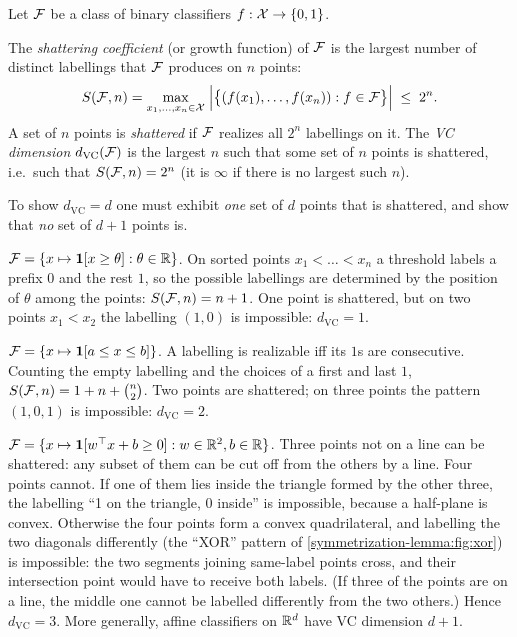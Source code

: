 \begin{notechapter}
Let $\mathcal{F}$ be a class of binary classifiers $f:\mathcal{X}\to\{0,1\}$.

\begin{definition}
The \emph{shattering coefficient} (or growth function) of $\mathcal{F}$ is the largest
number of distinct labellings that $\mathcal{F}$ produces on $n$ points:
\[
  S(\mathcal{F}, n) = \max_{x_1,\dots,x_n\in\mathcal{X}}\;\Bigl|\bigl\{(f(x_1),\dots,f(x_n)) : f\in\mathcal{F}\bigr\}\Bigr| \;\leq\; 2^n .
\]
A set of $n$ points is \emph{shattered} if $\mathcal{F}$ realizes all $2^n$ labellings
on it. The \emph{VC dimension} $d_{\mathrm{VC}}(\mathcal{F})$ is the largest $n$ such
that some set of $n$ points is shattered, i.e.\ such that $S(\mathcal{F},n) = 2^n$
(it is $\infty$ if there is no largest such $n$).
\end{definition}

To show $d_{\mathrm{VC}} = d$ one must exhibit \emph{one} set of $d$ points that
is shattered, and show that \emph{no} set of $d+1$ points is.

\begin{example}
$\mathcal{F} = \{x\mapsto\mathbf{1}[x\geq\theta] : \theta\in\mathbb{R}\}$. On sorted points
$x_1<\dots<x_n$ a threshold labels a prefix $0$ and the rest $1$, so the
possible labellings are determined by the position of $\theta$ among the
points: $S(\mathcal{F},n) = n+1$. One point is shattered, but on two points
$x_1 < x_2$ the labelling $(1,0)$ is impossible: $d_{\mathrm{VC}} = 1$.
\end{example}

\begin{example}[Intervals]
$\mathcal{F} = \{x\mapsto\mathbf{1}[a\leq x\leq b]\}$. A labelling is realizable iff its
$1$s are consecutive. Counting the empty labelling and the choices of a first
and last $1$, $S(\mathcal{F},n) = 1 + n + \binom n2$. Two points are shattered; on three
points the pattern $(1,0,1)$ is impossible: $d_{\mathrm{VC}} = 2$.
\end{example}

\begin{example}\label{symmetrization-lemma:ex:halfplanes}
$\mathcal{F} = \{x\mapsto\mathbf{1}[w^\top x + b\geq0] : w\in\mathbb{R}^2, b\in\mathbb{R}\}$. Three points
not on a line can be shattered: any subset of them can be cut off from the
others by a line. Four points cannot. If one of them lies inside the triangle
formed by the other three, the labelling ``1 on the triangle, 0 inside'' is
impossible, because a half-plane is convex. Otherwise the four points form a
convex quadrilateral, and labelling the two diagonals differently (the ``XOR''
pattern of \cref{symmetrization-lemma:fig:xor}) is impossible: the two
segments joining same-label points cross, and their intersection point would
have to receive both labels. (If three of the points are on a line, the
middle one cannot be labelled differently from the two others.) Hence
$d_{\mathrm{VC}} = 3$. More generally, affine
classifiers on $\mathbb{R}^d$ have VC dimension $d+1$.
\end{example}


\end{notechapter}

